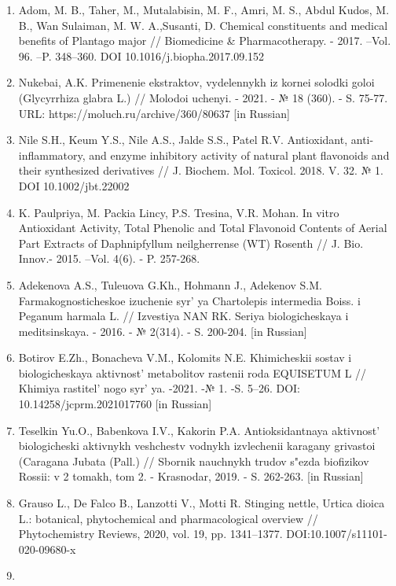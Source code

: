 \begin{references}
\begin{enumerate}
\def\labelenumi{\arabic{enumi}.}
\item
  Adom, M. B., Taher, M., Mutalabisin, M. F., Amri, M. S., Abdul Kudos,
  M. B., Wan Sulaiman, M. W. A.,Susanti, D. Chemical constituents and
  medical benefits of Plantago major // Biomedicine \& Pharmacotherapy.
  - 2017. --Vol. 96. --P. 348--360. DOI 10.1016/j.biopha.2017.09.152
\item
  Nukebai, A.K. Primenenie ekstraktov, vydelennykh iz kornei solodki
  goloi (Glycyrrhiza glabra L.) // Molodoi uchenyi. - 2021. - № 18
  (360). - S. 75-77. URL: https://moluch.ru/archive/360/80637 {[}in
  Russian{]}
\item
  Nile S.H., Keum Y.S., Nile A.S., Jalde S.S., Patel R.V. Antioxidant,
  anti-inflammatory, and enzyme inhibitory activity of natural plant
  flavonoids and their synthesized derivatives // J. Biochem. Mol.
  Toxicol. 2018. V. 32. № 1. DOI 10.1002/jbt.22002
\item
  K. Paulpriya, M. Packia Lincy, P.S. Tresina, V.R. Mohan. In vitro
  Antioxidant Activity, Total Phenolic and Total Flavonoid Contents of
  Aerial Part Extracts of Daphnipfyllum neilgherrense (WT) Rosenth // J.
  Bio. Innov.- 2015. --Vol. 4(6). - P. 257-268.
\item
  Adekenova A.S., Tuleuova G.Kh., Hohmann J., Adekenov S.M.
  Farmakognosticheskoe izuchenie syr' ya Chartolepis
  intermedia Boiss. i Peganum harmala L. // Izvestiya NAN RK. Seriya
  biologicheskaya i meditsinskaya. - 2016. - № 2(314). - S. 200-204.
  {[}in Russian{]}
\item
  Botirov E.Zh., Bonacheva V.M., Kolomits N.E. Khimicheskii sostav i
  biologicheskaya aktivnost'{} metabolitov rastenii roda
  EQUISETUM L // Khimiya rastitel' nogo
  syr' ya. -2021. -№ 1. -S. 5--26. DOI:
  10.14258/jcprm.2021017760 {[}in Russian{]}
\item
  Teselkin Yu.O., Babenkova I.V., Kakorin P.A. Antioksidantnaya
  aktivnost'{} biologicheski aktivnykh veshchestv vodnykh
  izvlechenii karagany grivastoi (Caragana Jubata (Pall.) // Sbornik
  nauchnykh trudov s"ezda biofizikov Rossii: v 2 tomakh, tom 2. -
  Krasnodar, 2019. - S. 262-263. {[}in Russian{]}
\item
  Grauso L., De Falco B., Lanzotti V., Motti R. Stinging nettle, Urtica
  dioica L.: botanical, phytochemical and pharmacological overview //
  Phytochemistry Reviews, 2020, vol. 19, pp. 1341--1377.
  DOI:10.1007/s11101-020-09680-x
\item

\end{enumerate}
\end{references}

